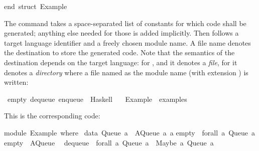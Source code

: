 \begin{isabellebody}
\begin{isamarkuptext}
\isanewline
end{\isacharsemicolon}\ {\isacharparenleft}{\isacharasterisk}struct\ Example{\isacharasterisk}{\isacharparenright}\isanewline%
\end{isamarkuptext}%
\isamarkuptrue%
%
\endisatagquotetypewriter
{\isafoldquotetypewriter}%
%
\isadelimquotetypewriter
%
\endisadelimquotetypewriter
%
\begin{isamarkuptext}%
\noindent The \hypertarget{command.export-code}{\hyperlink{command.export-code}{\mbox{}}} command takes a
  space-separated list of constants for which code shall be generated;
  anything else needed for those is added implicitly.  Then follows a
  target language identifier and a freely chosen module name.  A file
  name denotes the destination to store the generated code.  Note that
  the semantics of the destination depends on the target language: for
  ,  and  it denotes a \emph{file},
  for  it denotes a \emph{directory} where a file named as the
  module name (with extension ) is written:%
\end{isamarkuptext}%
\isamarkuptrue%
%
\isadelimquote
%
\endisadelimquote
%
\isatagquote
{}\isamarkupfalse%
\ empty\ dequeue\ enqueue\ \ Haskell\isanewline
\ \ \ Example\ \ {\isachardoublequoteopen}examples{\isacharslash}{\isachardoublequoteclose}%
\endisatagquote
{\isafoldquote}%
%
\isadelimquote
%
\endisadelimquote
%
\begin{isamarkuptext}%
\noindent This is the corresponding code:%
\end{isamarkuptext}%
\isamarkuptrue%
%
\isadelimquotetypewriter
%
\endisadelimquotetypewriter
%
\isatagquotetypewriter
%
\begin{isamarkuptext}%
module\ Example\ where\ {\isacharbraceleft}\isanewline
\isanewline
data\ Queue\ a\ {\isacharequal}\ AQueue\ {\isacharbrackleft}a{\isacharbrackright}\ {\isacharbrackleft}a{\isacharbrackright}{\isacharsemicolon}\isanewline
\isanewline
empty\ {\isacharcolon}{\isacharcolon}\ forall\ a{\isachardot}\ Queue\ a{\isacharsemicolon}\isanewline
empty\ {\isacharequal}\ AQueue\ {\isacharbrackleft}{\isacharbrackright}\ {\isacharbrackleft}{\isacharbrackright}{\isacharsemicolon}\isanewline
\isanewline
dequeue\ {\isacharcolon}{\isacharcolon}\ forall\ a{\isachardot}\ Queue\ a\ {\isacharminus}{\isachargreater}\ {\isacharparenleft}Maybe\ a{\isacharcomma}\ Queue\ a{\isacharparenright}{\isacharsemicolon}\isanewline

\end{isamarkuptext}
\end{isabellebody}
